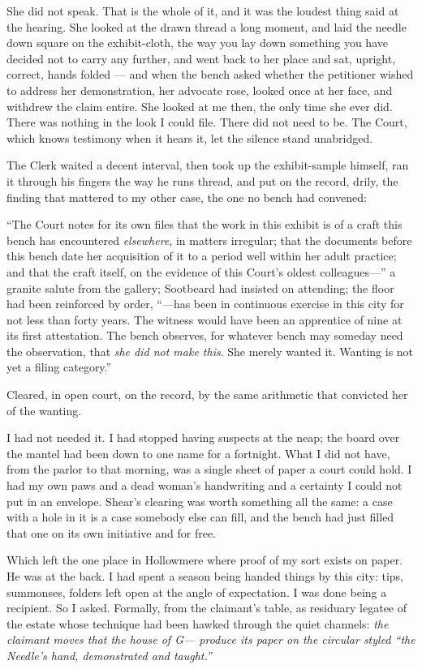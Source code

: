 She did not speak. That is the whole of it, and it was the loudest thing said at the hearing. She looked at the drawn thread a long moment, and laid the needle down square on the exhibit-cloth, the way you lay down something you have decided not to carry any further, and went back to her place and sat, upright, correct, hands folded --- and when the bench asked whether the petitioner wished to address her demonstration, her advocate rose, looked once at her face, and withdrew the claim entire. She looked at me then, the only time she ever did. There was nothing in the look I could file. There did not need to be. The Court, which knows testimony when it hears it, let the silence stand unabridged.

The Clerk waited a decent interval, then took up the exhibit-sample himself, ran it through his fingers the way he runs thread, and put on the record, drily, the finding that mattered to my other case, the one no bench had convened:

``The Court notes for its own files that the work in this exhibit is of a craft this bench has encountered \emph{elsewhere}, in matters irregular; that the documents before this bench date her acquisition of it to a period well within her adult practice; and that the craft itself, on the evidence of this Court's oldest colleagues---'' a granite salute from the gallery; Sootbeard had insisted on attending; the floor had been reinforced by order, ``---has been in continuous exercise in this city for not less than forty years. The witness would have been an apprentice of nine at its first attestation. The bench observes, for whatever bench may someday need the observation, that \emph{she did not make this}. She merely wanted it. Wanting is not yet a filing category.''

Cleared, in open court, on the record, by the same arithmetic that convicted her of the wanting.

I had not needed it. I had stopped having suspects at the neap; the board over the mantel had been down to one name for a fortnight. What I did not have, from the parlor to that morning, was a single sheet of paper a court could hold. I had my own paws and a dead woman's handwriting and a certainty I could not put in an envelope. Shear's clearing was worth something all the same: a case with a hole in it is a case somebody else can fill, and the bench had just filled that one on its own initiative and for free.

Which left the one place in Hollowmere where proof of my sort exists on paper. He was at the back. I had spent a season being handed things by this city: tips, summonses, folders left open at the angle of expectation. I was done being a recipient. So I asked. Formally, from the claimant's table, as residuary legatee of the estate whose technique had been hawked through the quiet channels: \emph{the claimant moves that the house of G--- produce its paper on the circular styled ``the Needle's hand, demonstrated and taught.''}

